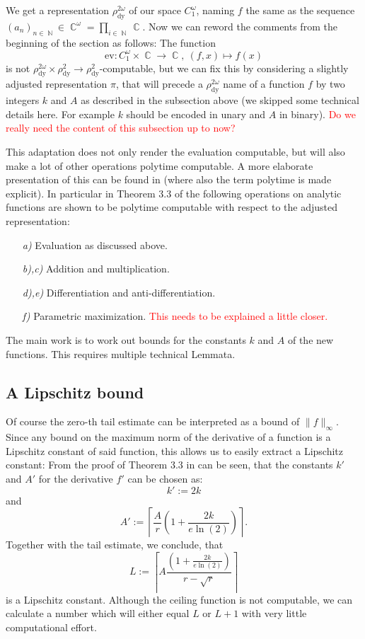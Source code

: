 \documentclass{article}
\DeclareMathOperator{\NN}{\ensuremath{\mathbb{N}}\xspace}
\DeclareMathOperator{\CC}{\ensuremath{\mathbb{C}}\xspace}
\newcommand{\temp}[1]{\textcolor{red}{#1}}
\begin{document}
We get a representation $\rho^{2\omega}_{\mathrm{dy}}$ of our space $C^\omega_1$, naming $f$ the same as the sequence $(a_n)_{n\in \NN} \in \CC^\omega = \prod_{i\in \NN}\CC$. Now we can reword the comments from the beginning of the section as follows: The function
\[ \mathrm{ev}: C^\omega_1\times \CC \to \CC, ~ (f,x) \mapsto f(x) \]
is not $\rho^{2\omega}_{\mathrm{dy}}\times \rho^2_{\mathrm{dy}}\to\rho^2_{\mathrm{dy}}$-computable, but we can fix this by considering a slightly adjusted representation $\pi$, that will precede a $\rho^{2\omega}_{\mathrm{dy}}$ name of a function $f$ by two integers $k$ and $A$ as described in the subsection above (we skipped some technical details here. For example $k$ should be encoded in unary and $A$ in binary). \temp{Do we really need the content of this subsection up to now?}

This adaptation does not only render the evaluation computable, but will also make a lot of other operations polytime computable. A more elaborate presentation of this can be found in \cite{gevrey} (where also the term polytime is made explicit). In particular in Theorem 3.3 of \cite{gevrey} the following operations on analytic functions are shown to be polytime computable with respect to the adjusted representation:
\begin{enumerate}
\item[\itshape{a)}] Evaluation as discussed above.
\item[\itshape{b)},\itshape{c)}] Addition and multiplication.
\item[\itshape{d),e)}] Differentiation and anti-differentiation.
\item[\itshape{f)}] Parametric maximization. \temp{This needs to be explained a little closer.}
\end{enumerate}
The main work is to work out bounds for the constants $k$ and $A$ of the new functions. This requires multiple technical Lemmata.

\subsection{A Lipschitz bound}

Of course the zero-th tail estimate can be interpreted as a bound of $\|f\|_\infty$. Since any bound on the maximum norm of the derivative of a function is a Lipschitz constant of said function, this allows us to easily extract a Lipschitz constant: From the proof of Theorem 3.3 in \cite{gevrey} can be seen, that the constants $k'$ and $A'$ for the derivative $f'$ can be chosen as:
\[ k' := 2 k \]
and
\[ A' := \left\lceil \frac{A}{r} \left(1+ \frac{2k}{e \ln(2)}\right)\right\rceil. \]
Together with the tail estimate, we conclude, that
\[ L := \left\lceil A \frac{\left(1 + \frac{2k}{e\ln(2)}\right)}{r-\sqrt{r}}\right\rceil \]
is a Lipschitz constant. Although the ceiling function is not computable, we can calculate a number which will either equal $L$ or $L+1$ with very little computational effort.
\end{document}
